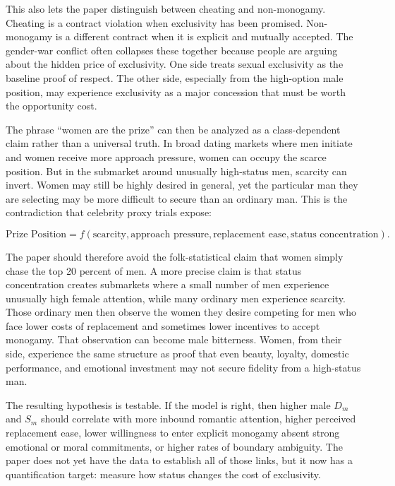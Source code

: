\documentclass[12pt]{article}
\begin{document}
This also lets the paper distinguish between cheating and non-monogamy. Cheating is a contract violation when exclusivity has been promised. Non-monogamy is a different contract when it is explicit and mutually accepted. The gender-war conflict often collapses these together because people are arguing about the hidden price of exclusivity. One side treats sexual exclusivity as the baseline proof of respect. The other side, especially from the high-option male position, may experience exclusivity as a major concession that must be worth the opportunity cost.

The phrase ``women are the prize'' can then be analyzed as a class-dependent claim rather than a universal truth. In broad dating markets where men initiate and women receive more approach pressure, women can occupy the scarce position. But in the submarket around unusually high-status men, scarcity can invert. Women may still be highly desired in general, yet the particular man they are selecting may be more difficult to secure than an ordinary man. This is the contradiction that celebrity proxy trials expose:

\begin{equation}
  \text{Prize Position}
  =
  f(\text{scarcity}, \text{approach pressure}, \text{replacement ease}, \text{status concentration}).
\end{equation}

The paper should therefore avoid the folk-statistical claim that women simply chase the top 20 percent of men. A more precise claim is that status concentration creates submarkets where a small number of men experience unusually high female attention, while many ordinary men experience scarcity. Those ordinary men then observe the women they desire competing for men who face lower costs of replacement and sometimes lower incentives to accept monogamy. That observation can become male bitterness. Women, from their side, experience the same structure as proof that even beauty, loyalty, domestic performance, and emotional investment may not secure fidelity from a high-status man.

The resulting hypothesis is testable. If the model is right, then higher male $D_m$ and $S_m$ should correlate with more inbound romantic attention, higher perceived replacement ease, lower willingness to enter explicit monogamy absent strong emotional or moral commitments, or higher rates of boundary ambiguity. The paper does not yet have the data to establish all of those links, but it now has a quantification target: measure how status changes the cost of exclusivity.
\end{document}
